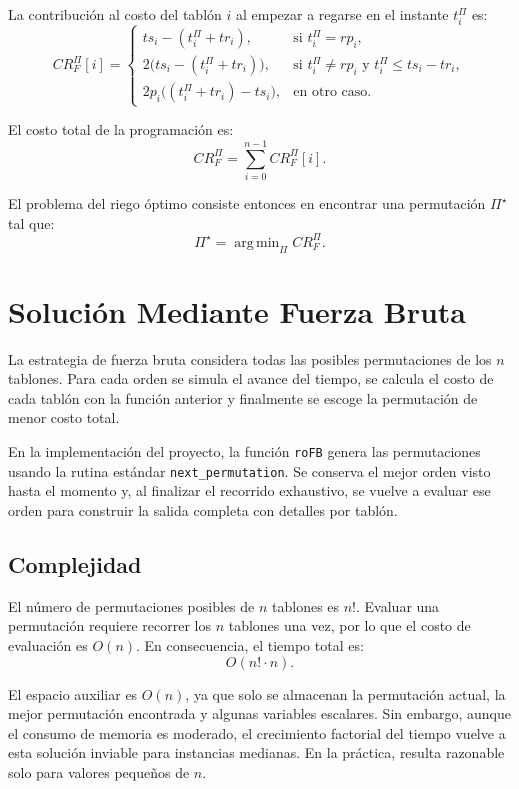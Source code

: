 \documentclass[12pt,a4paper]{article}
\DeclareMathOperator*{\argmin}{arg\,min}
\begin{document}
La contribuci\'on al costo del tabl\'on \(i\) al empezar a regarse en el instante \(t_i^\Pi\) es:
\[
CR_F^\Pi[i] =
\begin{cases}
ts_i - (t_i^\Pi + tr_i), & \text{si } t_i^\Pi = rp_i, \\[4pt]
2\bigl(ts_i - (t_i^\Pi + tr_i)\bigr), & \text{si } t_i^\Pi \neq rp_i \text{ y } t_i^\Pi \leq ts_i - tr_i, \\[4pt]
2p_i\bigl((t_i^\Pi + tr_i) - ts_i\bigr), & \text{en otro caso.}
\end{cases}
\]

El costo total de la programaci\'on es:
\[
CR_F^\Pi = \sum_{i=0}^{n-1} CR_F^\Pi[i].
\]

El problema del riego \'optimo consiste entonces en encontrar una permutaci\'on \(\Pi^\star\) tal que:
\[
\Pi^\star = \argmin_{\Pi} CR_F^\Pi.
\]

\section{Soluci\'on Mediante Fuerza Bruta}

La estrategia de fuerza bruta considera todas las posibles permutaciones de los \(n\) tablones. Para cada orden se simula el avance del tiempo, se calcula el costo de cada tabl\'on con la funci\'on anterior y finalmente se escoge la permutaci\'on de menor costo total.

En la implementaci\'on del proyecto, la funci\'on \texttt{roFB} genera las permutaciones usando la rutina est\'andar \texttt{next\_permutation}. Se conserva el mejor orden visto hasta el momento y, al finalizar el recorrido exhaustivo, se vuelve a evaluar ese orden para construir la salida completa con detalles por tabl\'on.

\subsection{Complejidad}

El n\'umero de permutaciones posibles de \(n\) tablones es \(n!\). Evaluar una permutaci\'on requiere recorrer los \(n\) tablones una vez, por lo que el costo de evaluaci\'on es \(O(n)\). En consecuencia, el tiempo total es:
\[
O(n! \cdot n).
\]

El espacio auxiliar es \(O(n)\), ya que solo se almacenan la permutaci\'on actual, la mejor permutaci\'on encontrada y algunas variables escalares. Sin embargo, aunque el consumo de memoria es moderado, el crecimiento factorial del tiempo vuelve a esta soluci\'on inviable para instancias medianas. En la pr\'actica, resulta razonable solo para valores peque\~nos de \(n\).
\end{document}

